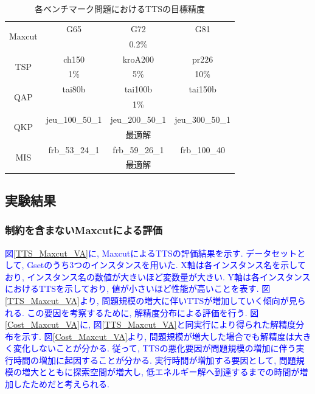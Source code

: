 \documentclass[submit,techrep,noauthor]{ipsj}
\begin{document}
\begin{table}[tb]
\centering
  \caption{各ベンチマーク問題におけるTTSの目標精度}
    \begin{tabular}{|c||c|c|c|}
      \hline
      \multirow{2}{*}{Maxcut} & G65 & G72 & G81\\
      \cline{2-2} \cline{3-3} \cline{4-4}
                            & \multicolumn{3}{|c|}{0.2\%}\\ \hline
      \multirow{2}{*}{TSP} & ch150 & kroA200 & pr226\\
      \cline{2-2} \cline{3-3} \cline{4-4}
                              & 1\% & 5\% & 10\%\\ \hline
      \multirow{2}{*}{QAP} & tai80b & tai100b & tai150b\\
      \cline{2-2} \cline{3-3} \cline{4-4}
                            & \multicolumn{3}{|c|}{1\%}\\ \hline
      \multirow{2}{*}{QKP} & jeu\_100\_50\_1 & jeu\_200\_50\_1 & jeu\_300\_50\_1\\
      \cline{2-2} \cline{3-3} \cline{4-4}
                            & \multicolumn{3}{|c|}{最適解}\\ \hline
      \multirow{2}{*}{MIS} & frb\_53\_24\_1 & frb\_59\_26\_1 & frb\_100\_40\\
      \cline{2-2} \cline{3-3} \cline{4-4}
                            & \multicolumn{3}{|c|}{最適解}\\ \hline
    \end{tabular}
\label{table_target}
\end{table}

\subsection{実験結果}

\subsubsection{制約を含まないMaxcutによる評価}
\textcolor{blue}{図\ref{TTS_Maxcut_VA}に, MaxcutによるTTSの評価結果を示す. データセットとして, Gset\cite{gset}のうち3つのインスタンスを用いた. X軸は各インスタンス名を示しており, インスタンス名の数値が大きいほど変数量が大きい. Y軸は各インスタンスにおけるTTSを示しており, 値が小さいほど性能が高いことを表す. 図\ref{TTS_Maxcut_VA}より, 問題規模の増大に伴いTTSが増加していく傾向が見られる. この要因を考察するために, 解精度分布による評価を行う. 図\ref{Cost_Maxcut_VA}に, 図\ref{TTS_Maxcut_VA}と同実行により得られた解精度分布を示す. 図\ref{Cost_Maxcut_VA}より, 問題規模が増大した場合でも解精度は大きく変化しないことが分かる. 従って, TTSの悪化要因が問題規模の増加に伴う実行時間の増加に起因することが分かる. 実行時間が増加する要因として, 問題規模の増大とともに探索空間が増大し, 低エネルギー解へ到達するまでの時間が増加したためだと考えられる.}
\end{document}
